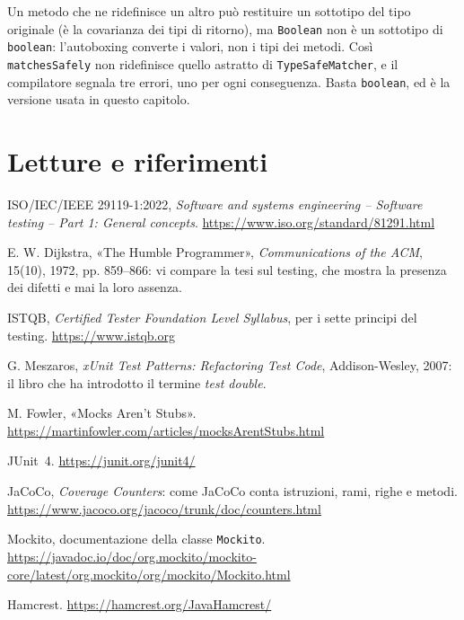 Un metodo che ne ridefinisce un altro può restituire un sottotipo del tipo originale (è la covarianza dei tipi di
ritorno), ma \texttt{Boolean} non è un sottotipo di \texttt{boolean}: l'autoboxing converte i valori, non i tipi dei
metodi. Così \texttt{matchesSafely} non ridefinisce quello astratto di \texttt{TypeSafeMatcher}, e il compilatore
segnala tre errori, uno per ogni conseguenza. Basta \texttt{boolean}, ed è la versione usata in questo capitolo.

\section{Letture e riferimenti}

\begin{enumerate}[label={[\arabic*]}, leftmargin=2.2em, itemsep=2pt]
  \item ISO/IEC/IEEE 29119-1:2022, \textit{Software and systems engineering -- Software testing -- Part 1: General
    concepts}. \url{https://www.iso.org/standard/81291.html}
  \item E. W. Dijkstra, «The Humble Programmer», \textit{Communications of the ACM}, 15(10), 1972, pp. 859--866: vi
    compare la tesi sul testing, che mostra la presenza dei difetti e mai la loro assenza.
  \item ISTQB, \textit{Certified Tester Foundation Level Syllabus}, per i sette principi del testing.
    \url{https://www.istqb.org}
  \item G. Meszaros, \textit{xUnit Test Patterns: Refactoring Test Code}, Addison-Wesley, 2007: il libro che ha
    introdotto il termine \textit{test double}.
  \item M. Fowler, «Mocks Aren't Stubs». \url{https://martinfowler.com/articles/mocksArentStubs.html}
  \item JUnit~4. \url{https://junit.org/junit4/}
  \item JaCoCo, \textit{Coverage Counters}: come JaCoCo conta istruzioni, rami, righe e metodi.
    \url{https://www.jacoco.org/jacoco/trunk/doc/counters.html}
  \item Mockito, documentazione della classe \texttt{Mockito}.
    \url{https://javadoc.io/doc/org.mockito/mockito-core/latest/org.mockito/org/mockito/Mockito.html}
  \item Hamcrest. \url{https://hamcrest.org/JavaHamcrest/}
\end{enumerate}

